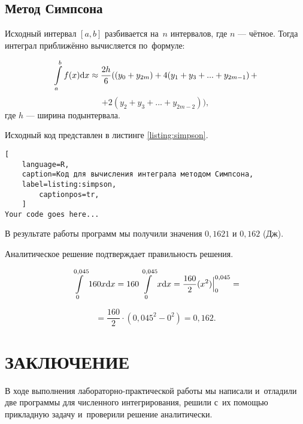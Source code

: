 \documentclass[14pt]{extarticle}
\begin{document}
\vspace{1.5em}\subsection{Метод Симпсона}

Исходный интервал $[a, b]$ разбивается на~$n$ интервалов, где $n$ --- чётное. Тогда интеграл приближённо вычисляется по~формуле:

$$
\int\displaylimits_{a}^{b} f(x) \mathrm{d}x
\approx \dfrac{2h}{6} ((y_0 + y_{2m})
+ 4(y_1 + y_3 + ... + y_{2m-1})\,+$$
$$+ 2(y_2 + y_3 + ... + y_{2m-2})),$$
где $h$ --- ширина подынтервала.

Исходный код представлен в листинге \ref{listing:simpson}.

\begin{lstlisting}[
	language=R,
	caption=Код для вычисления интеграла методом Симпсона,
	label=listing:simpson,
        captionpos=tr,
	]
Your code goes here...
\end{lstlisting}

В результате работы программ мы получили значения $0{,}1621$ и $0{,}162$ (Дж).

Аналитическое решение подтверждает правильность решения.

$$
\int\displaylimits_{0}^{0{,}045} 160x \mathrm{d}x
= 160 \int\displaylimits_{0}^{0{,}045} x \mathrm{d}x
= \dfrac{160}{2} (x^2) \Big|_{0}^{0{,}045} =
$$

$$
= \dfrac{160}{2} \cdot (0{,}045^2 - 0^2)
= 0{,}162.
$$


\clearpage

\section{\MakeUppercase{Заключение}}

В ходе выполнения лабораторно-практической работы мы написали и~отладили две программы для численного интегрирования, решили с~их помощью прикладную задачу и~проверили решение аналитически.
\end{document}

